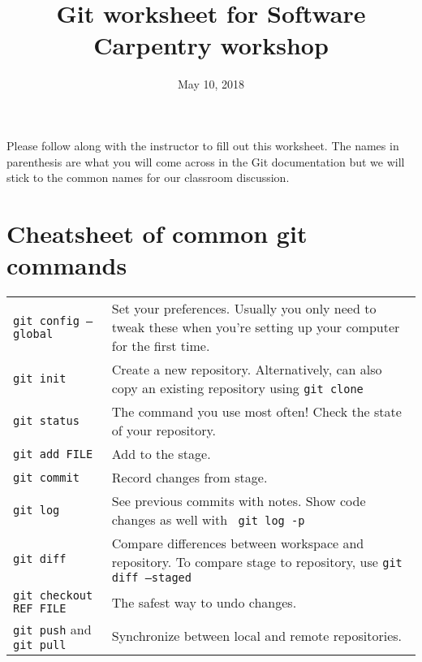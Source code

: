 \documentclass[12pt]{article}
\title{Git worksheet for Software Carpentry workshop}
\date{May 10, 2018}
\newcommand{\cbox}{\framebox{\phantom{X}}}
\newcommand{\code}[1]{\colorbox{light-gray}{\texttt{#1}}}
\begin{document}
\noindent
Please follow along with the instructor to fill out this worksheet.
The names in parenthesis are what you will come across in the Git documentation
but we will stick to the common names for our classroom discussion.
\\

\noindent
{}

\section*{Cheatsheet of common git commands}
\noindent
\begin{tabular}{ p{2.2in} | p{5in} }
  \cbox{} \code{git config --global} & Set your preferences.  Usually you only need to tweak these when you're setting up your computer for the first time. \\
  \cbox{} \code{git init} & Create a new repository.  Alternatively, can also copy an existing repository using \cbox{} \code{git clone} \\
  \cbox{} \code{git status} & The command you use most often!  Check the state of your repository. \\
  \cbox{} \code{git add FILE} & Add to the stage. \\
  \cbox{} \code{git commit} & Record changes from stage. \\
  \cbox{} \code{git log} &  See previous commits with notes. Show code changes as well with \cbox{}~\code{git log -p} \\
  \cbox{} \code{git diff} & Compare differences between workspace and repository.  To compare stage to repository, use \cbox{} \code{git diff --staged} \\
  \cbox{} \code{git checkout REF FILE} & The safest way to undo changes. \\
  \cbox{} \code{git push} and \code{git pull} & Synchronize between local and remote repositories. \\
\end{tabular}
\end{document}
